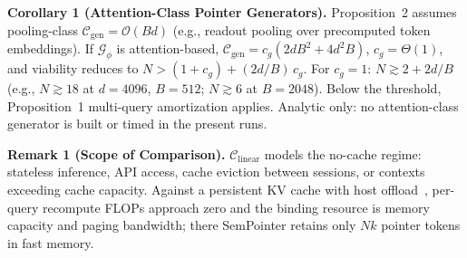 \documentclass[conference]{IEEEtran}
\begin{document}
{\vspace{0.3em}
\noindent\textbf{Corollary 1 (Attention-Class Pointer Generators).} Proposition~2 assumes pooling-class $\mathcal{C}_{\mathrm{gen}}=\mathcal{O}(Bd)$ (e.g., readout pooling over precomputed token embeddings). If $\mathcal{G}_\phi$ is attention-based, $\mathcal{C}_{\mathrm{gen}} = c_g(2dB^2 + 4d^2B)$, $c_g=\Theta(1)$, and viability reduces to $N > (1+c_g) + (2d/B)\,c_g$. For $c_g=1$: $N \gtrsim 2 + 2d/B$ (e.g., $N \gtrsim 18$ at $d{=}4096$, $B{=}512$; $N \gtrsim 6$ at $B{=}2048$). Below the threshold, Proposition~1 multi-query amortization applies. Analytic only: no attention-class generator is built or timed in the present runs.

\vspace{0.5em}
\noindent\textbf{Remark 1 (Scope of Comparison).} $\mathcal{C}_{\mathrm{linear}}$ models the no-cache regime: stateless inference, API access, cache eviction
between sessions, or contexts exceeding cache capacity. Against a
persistent KV cache with host offload~\cite{kwon2023pagedattention}, per-query recompute FLOPs
approach zero and the binding resource is memory capacity and paging
bandwidth; there SemPointer retains only $Nk$ pointer tokens in fast memory.

}
\end{document}
